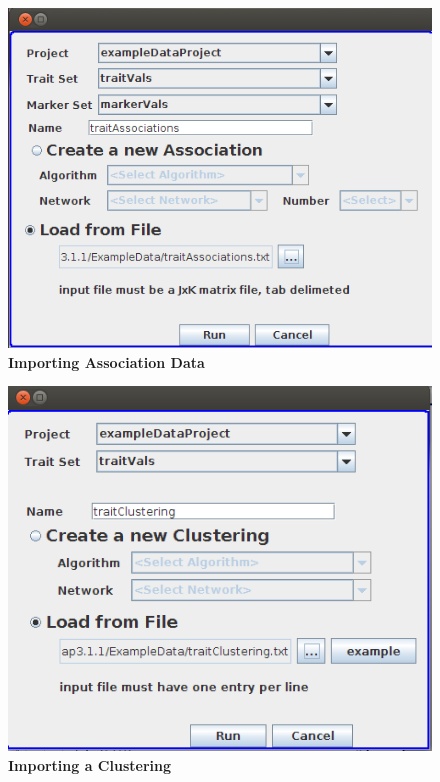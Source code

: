 \documentclass{article}
\begin{document}
\begin{figure}
\includegraphics[width=\textwidth]{Figure4.png}
\caption{\textbf{Importing Association Data}}
\label{association}
\end{figure}

\begin{figure}
\includegraphics[width=\textwidth]{Figure5.png}
\caption{\textbf{Importing a Clustering}}
\label{clustering}
\end{figure}
\end{document}
